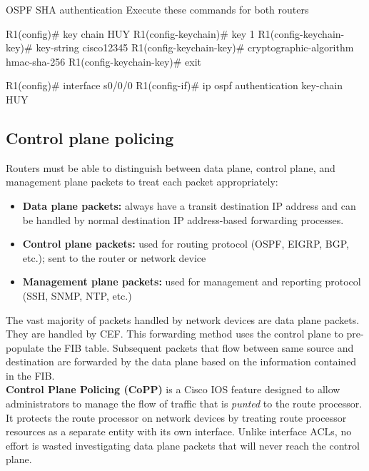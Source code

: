 \begin{sexylisting}{OSPF SHA authentication}
Execute these commands for both routers

R1(config)# key chain HUY
R1(config-keychain)# key 1
R1(config-keychain-key)# key-string cisco12345
R1(config-keychain-key)# cryptographic-algorithm hmac-sha-256
R1(config-keychain-key)# exit

R1(config)# interface s0/0/0
R1(config-if)# ip ospf authentication key-chain HUY
\end{sexylisting}

\subsection{Control plane policing}

Routers must be able to distinguish between data plane, control plane, and management plane packets to treat each packet appropriately:

\begin{itemize}
\item \textbf{Data plane packets:} always have a transit destination IP address and can be handled by normal destination IP address-based forwarding processes.
\item \textbf{Control plane packets:} used for routing protocol (OSPF, EIGRP, BGP, etc.); sent to the router or network device
\item \textbf{Management plane packets:} used for management and reporting protocol (SSH, SNMP, NTP, etc.)
\end{itemize}

The vast majority of packets handled by network devices are data plane packets. They are handled by CEF. This forwarding method uses the control plane to pre-populate the FIB table. Subsequent packets that flow between same source and destination are forwarded by the data plane based on the information contained in the FIB.\\

\textbf{Control Plane Policing (CoPP)} is a Cisco IOS feature designed to allow administrators to manage the flow of traffic that is \emph{punted} to the route processor. It protects the route processor on network devices by treating route processor resources as a separate entity with its own interface. Unlike interface ACLs, no effort is wasted investigating data plane packets that will never reach the control plane.